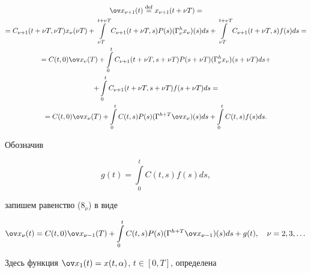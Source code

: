 \begin{gather*}


{\ov x_{{\nu}+1}}(t)\eqdef x_{{\nu}+1}(t+{\nu}T)=\\


%


=C_{{\nu}+1}(t+{\nu}T,{\nu}T)x_{{\nu}}({\nu}T)+


\int\limits_{{\nu}T}^


{t+{\nu}T}C_{{\nu}+1}(t+{\nu}T,s)


P(s)({\Gamma}_{{\nu}}^hx_{{\nu}})(s)ds+


\int\limits_{{\nu}T}^{t+{\nu}T}C_{{\nu}+1}(t+{\nu}T,s)f(s)ds=\\


%


=C(t,0){\ov x_{{\nu}}}(T)+


\int\limits_0^tC_{{\nu}+1}(t+{\nu}T,s+{\nu}T)


P(s+{\nu}T)({\Gamma}_{{\nu}}^hx_{{\nu}})(s+{\nu}T)ds+\\


%


+\int\limits_0^tC_{{\nu}+1}(t+{\nu}T,s+{\nu}T)f(s+{\nu}T)ds=\\


%


=C(t,0){\ov x_{{\nu}}}(T)+


\int\limits_0^tC(t,s)P(s)({\Gamma}^{h+T}{\ov x_{{\nu}}})(s)ds+


\int\limits_0^tC(t,s)f(s)ds.


\end{gather*}





Обозначив


$$


g(t)=\int\limits_0^tC(t,s)f(s)ds,


$$


запишем равенство ($8_{\nu}$) в виде\addtocounter{equation}{1}


\begin{equation}


{\ov x_{\nu}}(t)=C(t,0){\ov x_{\nu -1}}(T)+


\int\limits_0^tC(t,s)P(s)({\Gamma}^{h+T}{\ov x_{\nu -1}})(s)ds+g(t),


\quad {\nu}=2,3,\dotsc


\end{equation}


Здесь функция ${\ov x_1}(t)=x(t,{\alpha})$, $t\in [0,T]$, определена


